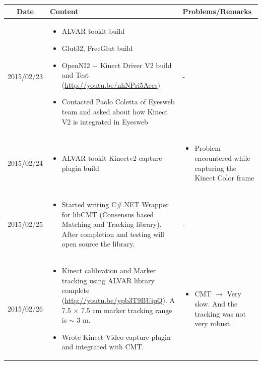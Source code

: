 \documentclass[11pt]{article} %
\begin{document}
\begin{center}
    \begin{longtable}{ | c | p{6cm} | p{5cm} |}
    \hline
    Date & Content & Problems/Remarks \\ 
    \endhead
    \hline    
     2015/02/23         & 
  \begin{itemize}
  \item ALVAR tookit build
  \item Glut32, FreeGlut build
  \item OpenNI2 + Kinect Driver V2 build and Test (\url{http://youtu.be/nhNPri5Aees})
  \item Contacted Paolo Coletta of Eyesweb team and asked about how Kinect V2 is integrated in Eyesweb
\end{itemize}  
   & - \\
\hline
  										 
 2015/02/24         & 
  \begin{itemize}
  \item ALVAR tookit Kinectv2 capture plugin build
\end{itemize}   
  										 & 
  \begin{itemize}
  \item Problem encountered while capturing the Kinect Color frame
\end{itemize}  \\
\hline
  										 
  
  2015/02/25         & 
  \begin{itemize}
  \item Started writing C\#.NET Wrapper for libCMT (Consensus based Matching and Tracking library). After completion and testing will open source the library.
\end{itemize}   
  										 & - \\
  \hline
  
  2015/02/26         & 
  \begin{itemize}
  \item Kinect calibration and Marker tracking using ALVAR library complete (\url{http://youtu.be/ypb3T9BUipQ}). A 7.5 $\times$ 7.5 cm marker tracking range is $\sim$ 3 m. 
  \item Wrote Kinect Video capture plugin and integrated with CMT.
\end{itemize}   
  & 
  \begin{itemize}
  										 \item CMT $\rightarrow$ Very slow. And the tracking was not very robust.
  										 \end{itemize} \\
  										 \hline


\end{longtable}
\end{center}
\end{document}
